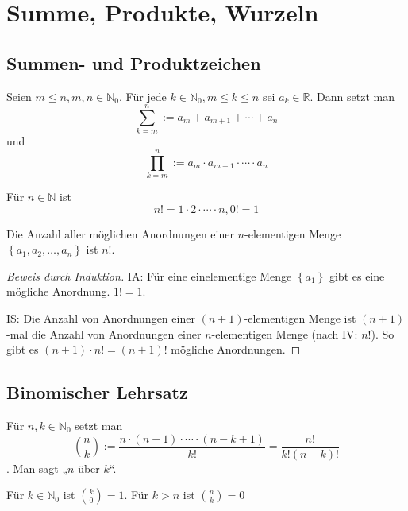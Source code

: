 
\chapter{Summe, Produkte, Wurzeln}

\section{Summen- und Produktzeichen}
\begin{notation}
  Seien $m \le n, m , n \in \mathbb{N}_0$. Für jede $k \in \mathbb{N}_0, m \le k \le n$ sei $a_k \in \mathbb{R}$. Dann setzt man \[ \sum_{k=m}^n := a_m + a_{m+1} + \cdots + a_n \] und \[ \prod_{k=m}^n := a_m \cdot a_{m+1} \cdot \cdots \cdot a_n \]
\end{notation}

\begin{definition}[Fakultät]
  Für $n \in \mathbb{N}$ ist \[ n! = 1 \cdot 2 \cdot \cdots \cdot n, 0! = 1 \]
\end{definition}

\begin{theorem}
  Die Anzahl aller möglichen Anordnungen einer $n$-elementigen Menge $\left\{ a_1, a_2, \dots, a_n \right\}$ ist $n!$.
\end{theorem}
\begin{proof}[Beweis durch Induktion]
  IA: Für eine einelementige Menge $\left\{ a_1 \right\}$ gibt es eine mögliche Anordnung. $1! = 1$.

  IS: Die Anzahl von Anordnungen einer $(n+1)$-elementigen Menge ist $(n+1)$-mal die Anzahl von Anordnungen einer $n$-elementigen Menge (nach IV: $n!$). So gibt es $(n+1) \cdot n! = (n+1)!$ mögliche Anordnungen.
\end{proof}

\section{Binomischer Lehrsatz}
\begin{definition}
  Für $n, k \in \mathbb{N}_0$ setzt man \[ \binom{n}{k} := \frac{n \cdot (n-1) \cdot \cdots \cdot (n-k+1)}{k!} = \frac{n!}{k! (n-k)!} \]. Man sagt „$n$ über $k$“.
\end{definition}
\begin{remark}
  Für $k \in \mathbb{N}_0$ ist $\binom{k}{0} = 1$. Für $k > n$ ist $\binom{n}{k} = 0$
\end{remark}

